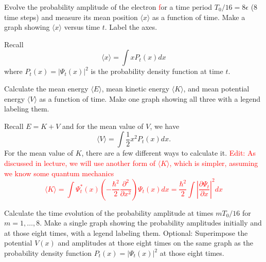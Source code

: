 \begin{solution}
\end{solution}

\begin{problem}[10]
Evolve the probability amplitude of the electron {\textcolor{red} for a time period $T_0/16 = 8 \epsilon$ (8 time steps)} and measure its mean position $\langle x \rangle$ as a function of time.
Make a graph showing $\langle x \rangle$ versus time $t$.
Label the axes.

\begin{hint}
  Recall
  \begin{equation}
    \langle x \rangle = \int x P_t(x) dx
  \end{equation}
  where $P_t(x) = |\Psi_t(x)|^2$ is the probability density function at time $t$.
\end{hint}
\end{problem}

\begin{solution}
\end{solution}

\begin{problem}[10]
Calculate the mean energy $\langle E \rangle$, mean kinetic energy $\langle K \rangle$, and mean potential energy $\langle V \rangle$ as a function of time.
Make one graph showing all three with a legend labeling them.

\begin{hint}
  Recall $E = K + V$ and for the mean value of $V$, we have
  \begin{equation}
    \langle V\rangle = \int \frac{1}{2}x^2 P_t(x) dx.
  \end{equation}
  For the mean value of $K$, there are a few different ways to calculate it.
  \textcolor{red}{
    Edit: As discussed in lecture, we will use another form of $\langle K\rangle$, which is simpler, assuming we know some quantum mechanics
    \begin{equation}
      \langle K\rangle = \int \Psi_t^\ast(x) \left(- \frac{\hbar^2}{2} \frac{\partial^2}{\partial x^2}\right) \Psi_t(x) dx = \frac{\hbar^2}{2} \int \left|\frac{\partial\Psi_t}{\partial x}\right|^2  dx
    \end{equation}
  }
\end{hint}
\end{problem}

\begin{solution}
\end{solution}

\begin{problem}[10]
Calculate the time evolution of the probability amplitude at times $mT_0/16$ for $m=1, \dots, 8$.
Make a single graph showing the probability amplitudes initially and at those eight times, with a legend labeling them.
Optional: Superimpose the potential $V(x)$ and amplitudes at those eight times on the same graph as the probability density function $P_t(x) = |\Psi_t(x)|^2$ at those eight times.
\end{problem}

